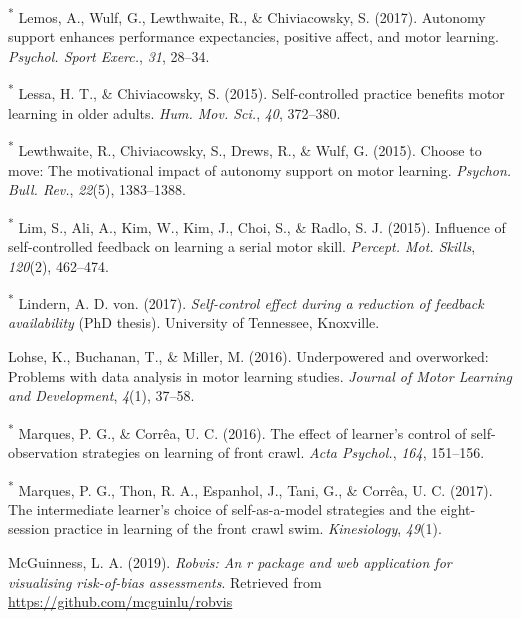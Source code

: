 \documentclass[
  english,
  man, donotrepeattitle,floatsintext]{apa7}
\newlength{\cslhangindent}
\newlength{\cslentryspacingunit} %
\newenvironment{CSLReferences}[2] %
 {%
  \setlength{\parindent}{0pt}
  \ifodd #1
  \let\oldpar\par
  \def\par{\hangindent=\cslhangindent\oldpar}
  \fi
  \setlength{\parskip}{#2\cslentryspacingunit}
 }%
 {}
\begin{document}
\begin{CSLReferences}{1}{0}
\leavevmode{}%
\textsuperscript{*} Lemos, A., Wulf, G., Lewthwaite, R., \& Chiviacowsky, S. (2017). Autonomy support enhances performance expectancies, positive affect, and motor learning. \emph{Psychol. Sport Exerc.}, \emph{31}, 28--34.

\leavevmode{}%
\textsuperscript{*} Lessa, H. T., \& Chiviacowsky, S. (2015). Self-controlled practice benefits motor learning in older adults. \emph{Hum. Mov. Sci.}, \emph{40}, 372--380.

\leavevmode{}%
\textsuperscript{*} Lewthwaite, R., Chiviacowsky, S., Drews, R., \& Wulf, G. (2015). Choose to move: The motivational impact of autonomy support on motor learning. \emph{Psychon. Bull. Rev.}, \emph{22}(5), 1383--1388.

\leavevmode{}%
\textsuperscript{*} Lim, S., Ali, A., Kim, W., Kim, J., Choi, S., \& Radlo, S. J. (2015). Influence of self-controlled feedback on learning a serial motor skill. \emph{Percept. Mot. Skills}, \emph{120}(2), 462--474.

\leavevmode{}%
\textsuperscript{*} Lindern, A. D. von. (2017). \emph{Self-control effect during a reduction of feedback availability} (PhD thesis). University of Tennessee, Knoxville.

\leavevmode{}%
Lohse, K., Buchanan, T., \& Miller, M. (2016). Underpowered and overworked: Problems with data analysis in motor learning studies. \emph{Journal of Motor Learning and Development}, \emph{4}(1), 37--58.

\leavevmode{}%
\textsuperscript{*} Marques, P. G., \& Corrêa, U. C. (2016). The effect of learner's control of self-observation strategies on learning of front crawl. \emph{Acta Psychol.}, \emph{164}, 151--156.

\leavevmode{}%
\textsuperscript{*} Marques, P. G., Thon, R. A., Espanhol, J., Tani, G., \& Corrêa, U. C. (2017). The intermediate learner's choice of self-as-a-model strategies and the eight-session practice in learning of the front crawl swim. \emph{Kinesiology}, \emph{49}(1).

\leavevmode{}%
McGuinness, L. A. (2019). \emph{Robvis: An r package and web application for visualising risk-of-bias assessments}. Retrieved from \url{https://github.com/mcguinlu/robvis}


\end{CSLReferences}
\end{document}
